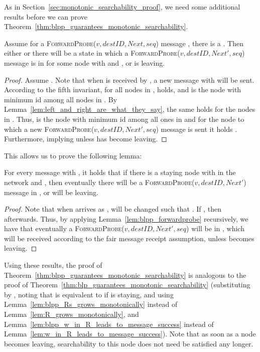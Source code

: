 \documentclass[a4paper,USenglish]{lipics}
\newcommand{\forwardprobe}[1]{\textsc{ForwardProbe(\ensuremath{#1})}\xspace}
\begin{document}
As in Section~\ref{sec:monotonic_searchability_proof}, we need some additional results before we can prove Theorem~\ref{thm:blpp_guarantees_monotonic_searchability}.
\begin{lemma}\label{lem:blpp_forwardprobe}
Assume for a \forwardprobe{v,destID, Next, seq} message , there is a .
Then either  or there will be a state in which a \forwardprobe{v,destID, Next', seq} message is in  for some node  with  and , or  is leaving.
\end{lemma}
\begin{proof}
    Assume .
    Note that when  is received by , a new message with  will be sent.
    According to the fifth invariant, for all nodes  in ,  holds, and  is the node with minimum id among all nodes in .
    By Lemma~\ref{lem:left_and_right_are_what_they_say}, the same holds for the nodes  in .
    Thus,  is the node with minimum id among all ones in  and for the node  to which a new \forwardprobe{v,destID,Next',seq} message is sent it holds .
    Furthermore,  implying  unless  has become leaving.
\end{proof}
This allows us to prove the following lemma:
\begin{lemma}\label{lem:blpp_w_in_R_leads_to_message_success}
 For every message  with , it holds that if there is a staying node  with  in the network and , then eventually there will be a \forwardprobe{v,destID,Next'} message in , or  will be leaving.
\end{lemma}
\begin{proof}
	Note that when  arrives as ,  will be changed such that .
	If , then  afterwards.
	Thus, by applying Lemma~\ref{lem:blpp_forwardprobe} recursively, we have that eventually a \forwardprobe{v,destID, Next', seq} will be in , which will be received according to the fair message receipt assumption, unless  becomes leaving.
\end{proof}

Using these results, the proof of Theorem~\ref{thm:blpp_guarantees_monotonic_searchability} is analogous to the proof of Theorem~\ref{thm:blp_guarantees_monotonic_searchability} (substituting  by , noting that  is equivalent to  if  is staying, and using Lemma~\ref{lem:blpp_Rs_grows_monotonically} instead of Lemma~\ref{lem:R_grows_monotonically}, and Lemma~\ref{lem:blpp_w_in_R_leads_to_message_success} instead of Lemma~\ref{lem:w_in_R_leads_to_message_success}).
Note that as soon as a node becomes leaving, searchability to this node does not need be satisfied any longer.
\end{document}
